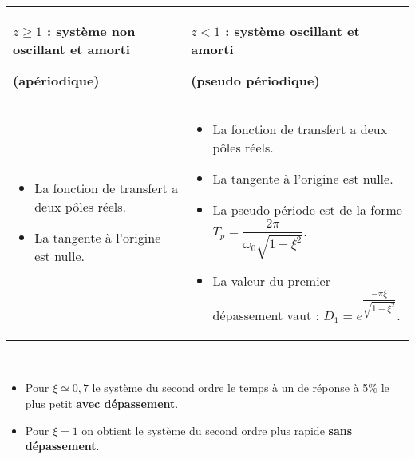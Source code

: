 \documentclass[10pt,fleqn]{article} %
\begin{document}
\begin{resultat} ~\\

\vspace*{-1.3cm}

\noindent\begin{center}
\begin{tabular}{p{.4\linewidth}p{.58\linewidth}}
\begin{center}
\textbf{$z\geq 1$ : système non oscillant et amorti}

\textbf{(apériodique)}


\end{center} 
& 
\begin{center}
\textbf{$z<1$ : système oscillant et amorti }

\textbf{(pseudo périodique)}


\end{center} 
\\
\vspace*{-1cm}
\begin{itemize} 
\item La fonction de transfert a deux pôles réels.
\item La tangente à l'origine est nulle.
\end{itemize}
& 
\vspace*{-.8cm}
\begin{itemize} 
\item La fonction de transfert a deux pôles réels.
\item La tangente à l'origine est nulle.
\item La pseudo-période est de la forme $T_p=\dfrac{2\pi }{\omega_0 \sqrt{1-\xi^2}}$.
\item La valeur du premier dépassement vaut : $D_1=e^{\dfrac{-\pi \xi }{\sqrt{1-\xi^2}}}$.
\end{itemize}
\end{tabular}
\end{center}
\end{resultat}

\begin{resultat} ~\\
\begin{itemize}
\item Pour $\xi\simeq 0,7$ le système du second ordre le temps à un de réponse à 5\% le plus petit \textbf{avec dépassement}.
\item Pour $\xi =1$ on obtient le système du second ordre plus rapide \textbf{sans dépassement}.
\end{itemize}
\end{resultat}
\end{document}
